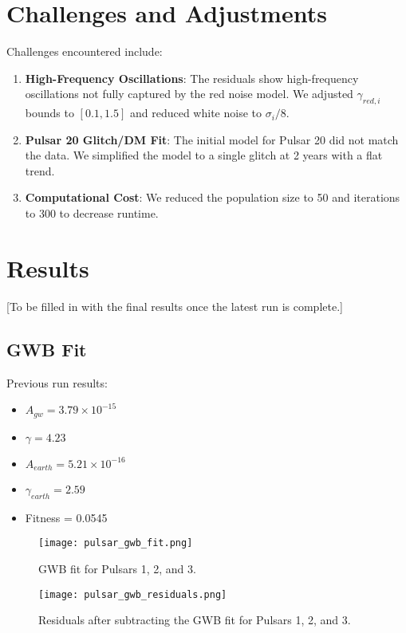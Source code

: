 \documentclass[11pt]{article}
\begin{document}
\section{Challenges and Adjustments}
Challenges encountered include:
\begin{enumerate}
    \item \textbf{High-Frequency Oscillations}: The residuals show high-frequency oscillations not fully captured by the red noise model. We adjusted $\gamma_{red,i}$ bounds to $[0.1, 1.5]$ and reduced white noise to $\sigma_i / 8$.
    \item \textbf{Pulsar 20 Glitch/DM Fit}: The initial model for Pulsar 20 did not match the data. We simplified the model to a single glitch at 2 years with a flat trend.
    \item \textbf{Computational Cost}: We reduced the population size to 50 and iterations to 300 to decrease runtime.
\end{enumerate}

\section{Results}
[To be filled in with the final results once the latest run is complete.]

\subsection{GWB Fit}
Previous run results:
\begin{itemize}
    \item $A_{gw} = 3.79 \times 10^{-15}$
    \item $\gamma = 4.23$
    \item $A_{earth} = 5.21 \times 10^{-16}$
    \item $\gamma_{earth} = 2.59$
    \item Fitness = 0.0545
\end{itemize}

\begin{figure}[h]
    \centering
    \texttt{[image: pulsar\_gwb\_fit.png]}
    \caption{GWB fit for Pulsars 1, 2, and 3.}
    \label{fig:gwb_fit}
\end{figure}

\begin{figure}[h]
    \centering
    \texttt{[image: pulsar\_gwb\_residuals.png]}
    \caption{Residuals after subtracting the GWB fit for Pulsars 1, 2, and 3.}
    \label{fig:gwb_residuals}
\end{figure}
\end{document}
